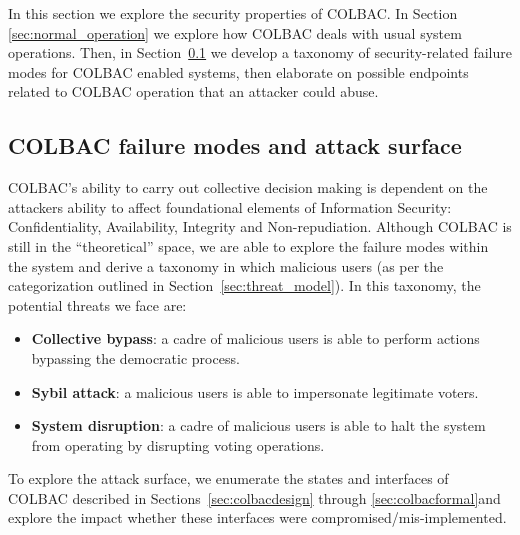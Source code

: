 
In this section we explore the security properties of COLBAC. In Section
\ref{sec:normal_operation} we explore how COLBAC deals with usual system
operations. Then, in Section~\ref{sec:failure_modes} we develop a taxonomy of
security-related failure modes for COLBAC enabled systems, then elaborate on
possible endpoints related to COLBAC operation that an attacker could abuse.

\subsection{COLBAC failure modes and attack surface}
\label{sec:failure_modes}

COLBAC's ability to carry out collective decision making is dependent on the
attackers ability to affect foundational elements of Information Security:
Confidentiality, Availability, Integrity and Non-repudiation. Although COLBAC
is still in the ``theoretical'' space, we are able to explore the failure modes
within the system and derive a taxonomy in which malicious users (as per the
categorization outlined in Section~\ref{sec:threat_model}). In this taxonomy,
the potential threats we face are:

\begin{itemize}
    \item {\bf Collective bypass}: a cadre of malicious users is able
        to perform actions bypassing the democratic process.

    \item {\bf Sybil attack}: a malicious users is able
        to impersonate legitimate voters.

    \item {\bf System disruption}: a cadre of malicious users is able to halt
        the system from operating by disrupting voting operations.

\end{itemize}

To explore the attack surface, we enumerate the states and interfaces of
COLBAC described in Sections~\ref{sec:colbacdesign} through 
\ref{sec:colbacformal}and explore the impact whether these interfaces were
compromised/mis-implemented.\\

